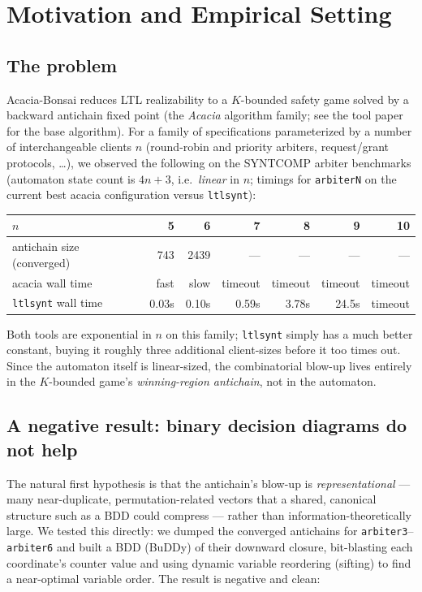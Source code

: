 \documentclass[11pt]{article}
\begin{document}
\tableofcontents

\section{Motivation and Empirical Setting}
\label{sec:motivation}

\subsection{The problem}
Acacia-Bonsai reduces LTL realizability to a $K$-bounded safety game solved
by a backward antichain fixed point (the \emph{Acacia} algorithm family; see
the tool paper for the base algorithm). For a family of specifications
parameterized by a number of interchangeable clients $n$ (round-robin and
priority arbiters, request/grant protocols, \dots), we observed the
following on the SYNTCOMP arbiter benchmarks (automaton state count is
$4n+3$, i.e.\ \emph{linear} in $n$; timings for \texttt{arbiterN} on the
current best acacia configuration versus \texttt{ltlsynt}):

\begin{center}
\begin{tabular}{@{}lrrrrrr@{}}
\toprule
$n$ & 5 & 6 & 7 & 8 & 9 & 10\\
\midrule
antichain size (converged) & 743 & 2439 & --- & --- & --- & ---\\
acacia wall time & fast & slow & timeout & timeout & timeout & timeout\\
\texttt{ltlsynt} wall time & 0.03s & 0.10s & 0.59s & 3.78s & 24.5s & timeout\\
\bottomrule
\end{tabular}
\end{center}

Both tools are exponential in $n$ on this family; \texttt{ltlsynt} simply
has a much better constant, buying it roughly three additional client-sizes
before it too times out. Since the automaton itself is linear-sized, the
combinatorial blow-up lives entirely in the $K$-bounded game's
\emph{winning-region antichain}, not in the automaton.

\subsection{A negative result: binary decision diagrams do not help}
\label{sec:bdd-negative}
The natural first hypothesis is that the antichain's blow-up is
\emph{representational} --- many near-duplicate, permutation-related
vectors that a shared, canonical structure such as a BDD could compress ---
rather than information-theoretically large. We tested this directly: we
dumped the converged antichains for \texttt{arbiter3}--\texttt{arbiter6} and
built a BDD (BuDDy) of their downward closure, bit-blasting each
coordinate's counter value and using dynamic variable reordering (sifting)
to find a near-optimal variable order. The result is negative and clean:
\end{document}
